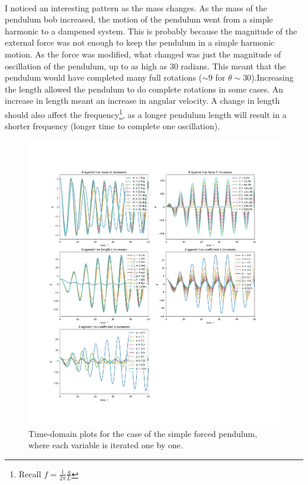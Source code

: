 \documentclass[10pt, twocolumn]{article}
\begin{document}
\\
I noticed an interesting pattern as the mass changes. As the mass of the pendulum bob increased, the motion of the pendulum went from a simple harmonic to a dampened system. This is probably because the magnitude of the external force was not enough to keep the pendulum in a simple harmonic motion. As the force was modified, what changed was just the magnitude of oscillation of the pendulum, up to as high as 30 radians. This meant that the pendulum would have completed many full rotations ($\sim{9}$ for $\theta\sim{30}$).Increasing the length allowed the pendulum to do complete rotations in some cases. An increase in length meant an increase in angular velocity. A change in length should also affect the frequency\footnote{Recall $f = \frac{1}{2\pi}\frac{g}{L}$}, as a longer pendulum length will result in a shorter frequency (longer time to complete one oscillation). 

\onecolumn
\begin{figure}
    \centering
    \includegraphics[width = 1.2\columnwidth]{Projects/ForcedSimplePendulum/Plots/test_plots.png}
    \caption{Time-domain plots for the case of the simple forced pendulum, where each variable is iterated one by one.}
    \label{time domain test}
\end{figure}
\end{document}
